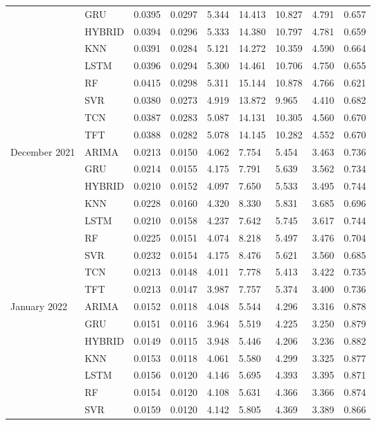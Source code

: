 \begin{tabular}{lllllllll}
 & GRU & 0.0395 & 0.0297 & 5.344 & 14.413 & 10.827 & 4.791 & 0.657 \\
 & HYBRID & 0.0394 & 0.0296 & 5.333 & 14.380 & 10.797 & 4.781 & 0.659 \\
 & KNN & 0.0391 & 0.0284 & 5.121 & 14.272 & 10.359 & 4.590 & 0.664 \\
 & LSTM & 0.0396 & 0.0294 & 5.300 & 14.461 & 10.706 & 4.750 & 0.655 \\
 & RF & 0.0415 & 0.0298 & 5.311 & 15.144 & 10.878 & 4.766 & 0.621 \\
 & SVR & 0.0380 & 0.0273 & 4.919 & 13.872 & 9.965 & 4.410 & 0.682 \\
 & TCN & 0.0387 & 0.0283 & 5.087 & 14.131 & 10.305 & 4.560 & 0.670 \\
 & TFT & 0.0388 & 0.0282 & 5.078 & 14.145 & 10.282 & 4.552 & 0.670 \\
December 2021 & ARIMA & 0.0213 & 0.0150 & 4.062 & 7.754 & 5.454 & 3.463 & 0.736 \\
 & GRU & 0.0214 & 0.0155 & 4.175 & 7.791 & 5.639 & 3.562 & 0.734 \\
 & HYBRID & 0.0210 & 0.0152 & 4.097 & 7.650 & 5.533 & 3.495 & 0.744 \\
 & KNN & 0.0228 & 0.0160 & 4.320 & 8.330 & 5.831 & 3.685 & 0.696 \\
 & LSTM & 0.0210 & 0.0158 & 4.237 & 7.642 & 5.745 & 3.617 & 0.744 \\
 & RF & 0.0225 & 0.0151 & 4.074 & 8.218 & 5.497 & 3.476 & 0.704 \\
 & SVR & 0.0232 & 0.0154 & 4.175 & 8.476 & 5.621 & 3.560 & 0.685 \\
 & TCN & 0.0213 & 0.0148 & 4.011 & 7.778 & 5.413 & 3.422 & 0.735 \\
 & TFT & 0.0213 & 0.0147 & 3.987 & 7.757 & 5.374 & 3.400 & 0.736 \\
January 2022 & ARIMA & 0.0152 & 0.0118 & 4.048 & 5.544 & 4.296 & 3.316 & 0.878 \\
 & GRU & 0.0151 & 0.0116 & 3.964 & 5.519 & 4.225 & 3.250 & 0.879 \\
 & HYBRID & 0.0149 & 0.0115 & 3.948 & 5.446 & 4.206 & 3.236 & 0.882 \\
 & KNN & 0.0153 & 0.0118 & 4.061 & 5.580 & 4.299 & 3.325 & 0.877 \\
 & LSTM & 0.0156 & 0.0120 & 4.146 & 5.695 & 4.393 & 3.395 & 0.871 \\
 & RF & 0.0154 & 0.0120 & 4.108 & 5.631 & 4.366 & 3.366 & 0.874 \\
 & SVR & 0.0159 & 0.0120 & 4.142 & 5.805 & 4.369 & 3.389 & 0.866 \\

\end{tabular}
